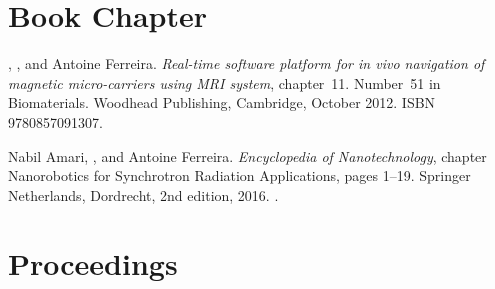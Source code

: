 \section{Book Chapter}

\begin{Mybibliography}{10}
  \KBelharet, \DavidFolio, and Antoine Ferreira.
  \newblock \emph{Real-time software platform for in vivo navigation of magnetic
    micro-carriers using {MRI} system}, chapter~11.
  \newblock Number~51 in Biomaterials. Woodhead Publishing, Cambridge, October
  2012{}.
  \newblock ISBN 9780857091307.
  
  Nabil Amari, \DavidFolio, and Antoine Ferreira.
  \newblock \emph{Encyclopedia of Nanotechnology}, chapter Nanorobotics for
  Synchrotron Radiation Applications, pages 1--19.
  \newblock Springer Netherlands, Dordrecht, 2nd edition, 2016.
  \newblock {}.
\end{Mybibliography}


\section{Proceedings}

